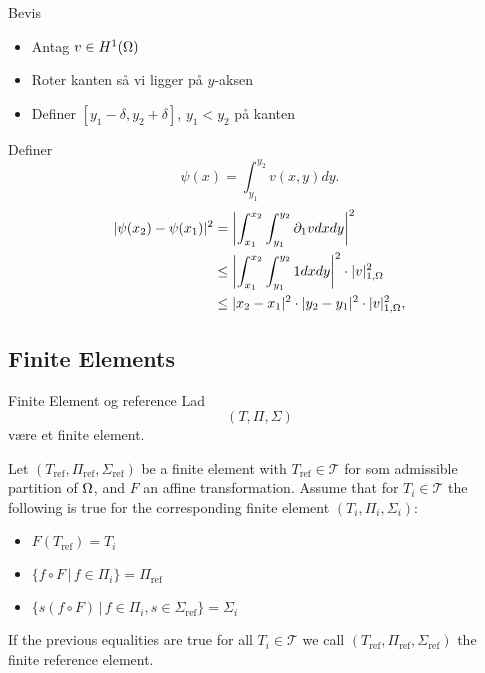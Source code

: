 \begin{frame}{Bevis}
   \begin{itemize}
    \item Antag $v\in H^1(\Omega)$ 
    \item Roter kanten så vi ligger på $y$-aksen 
    \item Definer $[y_1-\delta, y_2 +\delta]$, $y_1<y_2$ på kanten
   \end{itemize} 
   Definer 
    \begin{equation}
        \psi (x) = \int_{y_1}^{y_2} v(x,y) dy.
    \end{equation}
    \begin{align}
        |\psi(x_2) -\psi(x_1)|^2 &= \left| \int_{x_1}^{x_2} \int_{y_1}^{y_2} \partial_1 v dx dy \right|^2\\
        &\leq \left| \int_{x_1}^{x_2} \int_{y_1}^{y_2} 1 dx dy \right|^2 \cdot | v |_{1, \Omega}^2\\
        &\leq |x_2 - x_1|^2 \cdot |y_2 - y_1|^2 \cdot | v |_{1, \Omega}^2,
    \end{align}
\end{frame}
\subsection{Finite Elements}
\begin{frame}{Finite Element og reference}{}
    Lad 
    \begin{equation*}
        (T,\Pi,\Sigma)
    \end{equation*}
    være et finite element.
    \begin{definition}
    Let $(T_{\text{ref}}, \Pi_{\text{ref}},\Sigma_{\text{ref}})$ be a finite element 
    with $T_{\text{ref}}\in \mathcal{T}$ for som admissible partition of 
    $\Omega$, and 
    $F$ an affine transformation. 
    Assume that for $T_i\in\mathcal{T}$ the following 
    is true for the corresponding finite element $(T_i, \Pi_i,\Sigma_i)$:
    \begin{itemize}
        \item $F(T_{\text{ref}}) = T_i$
        \item $\{ f\circ F \,|\,  f \in \Pi_i \} =\Pi_{\text{ref}}  $
        \item $\{ s(f\circ F) \,|\, f \in \Pi_i, s \in \Sigma_{\text{ref}} \} = \Sigma_i$
    \end{itemize}
    If the previous equalities are true for all $T_i\in \mathcal{T}$ we call 
    $(T_{\text{ref}}, \Pi_{\text{ref}},\Sigma_{\text{ref}})$ the finite reference 
    element.
    \end{definition}
\end{frame}
